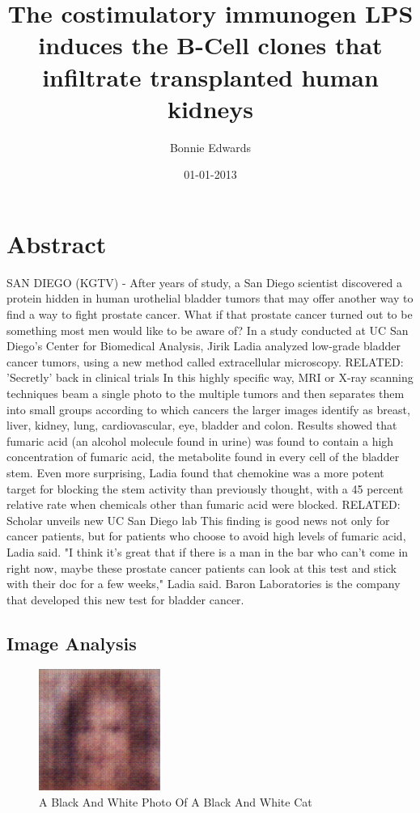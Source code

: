 \documentclass{article}%
\title{The costimulatory immunogen LPS induces the B{-}Cell clones that infiltrate transplanted human kidneys}%
\author{Bonnie Edwards}%
\affil{Center for Microbial Interface Biology, Department of Microbial Infection and Immunity, The Ohio State University, Columbus, Ohio, United States of America}%
\date{01{-}01{-}2013}%
\begin{document}
%
\normalsize%
\maketitle%
\section{Abstract}%
\label{sec:Abstract}%
SAN DIEGO (KGTV) {-} After years of study, a San Diego scientist discovered a protein hidden in human urothelial bladder tumors that may offer another way to find a way to fight prostate cancer.\newline%
What if that prostate cancer turned out to be something most men would like to be aware of?\newline%
In a study conducted at UC San Diego's Center for Biomedical Analysis, Jirik Ladia analyzed low{-}grade bladder cancer tumors, using a new method called extracellular microscopy.\newline%
RELATED: 'Secretly' back in clinical trials\newline%
In this highly specific way, MRI or X{-}ray scanning techniques beam a single photo to the multiple tumors and then separates them into small groups according to which cancers the larger images identify as breast, liver, kidney, lung, cardiovascular, eye, bladder and colon.\newline%
Results showed that fumaric acid (an alcohol molecule found in urine) was found to contain a high concentration of fumaric acid, the metabolite found in every cell of the bladder stem.\newline%
Even more surprising, Ladia found that chemokine was a more potent target for blocking the stem activity than previously thought, with a 45 percent relative rate when chemicals other than fumaric acid were blocked.\newline%
RELATED: Scholar unveils new UC San Diego lab\newline%
This finding is good news not only for cancer patients, but for patients who choose to avoid high levels of fumaric acid, Ladia said.\newline%
"I think it's great that if there is a man in the bar who can't come in right now, maybe these prostate cancer patients can look at this test and stick with their doc for a few weeks," Ladia said.\newline%
Baron Laboratories is the company that developed this new test for bladder cancer.

%
\subsection{Image Analysis}%
\label{subsec:ImageAnalysis}%


\begin{figure}[h!]%
\centering%
\includegraphics[width=150px]{500_fake_images/samples_5_392.png}%
\caption{A Black And White Photo Of A Black And White Cat}%
\end{figure}

%
\end{document}
